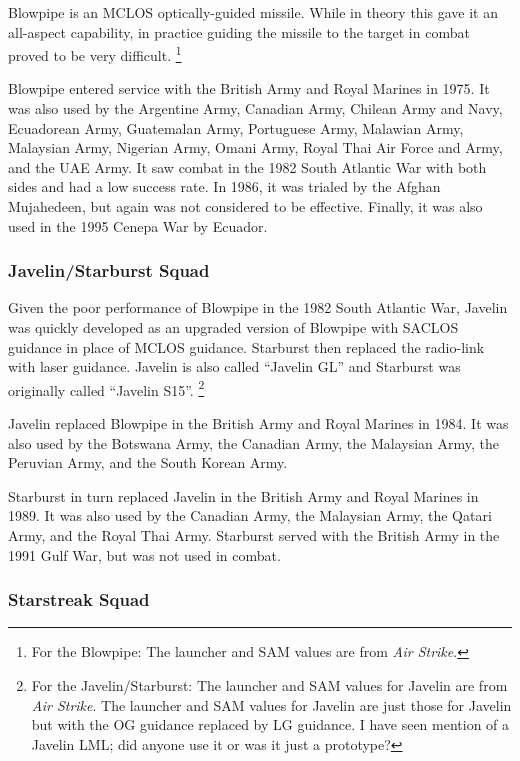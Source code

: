 \documentclass[10pt]{article}
\newcommand{\note}[1]{%
    \footnote{%
        \setlength{\parindent}{0pt}%
        \setlength{\parskip}{\smallskipamount}%
        #1
    }%
}
\begin{document}
Blowpipe is an MCLOS optically-guided missile.
While in theory this gave it an all-aspect capability, in practice guiding the missile to the target in combat proved to be very difficult.%
\note{
    For the Blowpipe: The launcher and SAM values are from \emph{Air Strike}.
}

Blowpipe entered service with the British Army and Royal Marines in 1975.
It was also used by the Argentine Army, Canadian Army, Chilean Army and Navy, Ecuadorean Army, Guatemalan Army, Portuguese Army, Malawian Army, Malaysian Army, Nigerian Army, Omani Army, Royal Thai Air Force and Army, and the UAE Army.
It saw combat in the 1982 South Atlantic War with both sides and had a low success rate.
In 1986, it was trialed by the Afghan Mujahedeen, but again was not considered to be effective.
Finally, it was also used in the 1995 Cenepa War by Ecuador.

\subsubsection{Javelin/Starburst Squad}

Given the poor performance of Blowpipe in the 1982 South Atlantic War, Javelin was quickly developed as an upgraded version of Blowpipe with SACLOS guidance in place of MCLOS guidance. Starburst then replaced the radio-link with laser guidance. Javelin is also called “Javelin GL” and Starburst was originally called “Javelin S15”.%
\note{
    For the Javelin/Starburst: The launcher and SAM values for Javelin are from \emph{Air Strike}. The launcher and SAM values for Javelin are just those for Javelin but with the OG guidance replaced by LG guidance. I have seen mention of a Javelin LML; did anyone use it or was it just a prototype?
}

Javelin replaced Blowpipe in the British Army and Royal Marines in 1984.
It was also used by the Botswana Army, the Canadian Army, the Malaysian Army, the Peruvian Army, and the South Korean Army.

Starburst in turn replaced Javelin in the British Army and Royal Marines in 1989.
It was also used by the Canadian Army, the Malaysian Army, the Qatari Army, and the Royal Thai Army.
Starburst served with the British Army in the 1991 Gulf War, but was not used in combat.

\subsubsection{Starstreak Squad}
\end{document}
